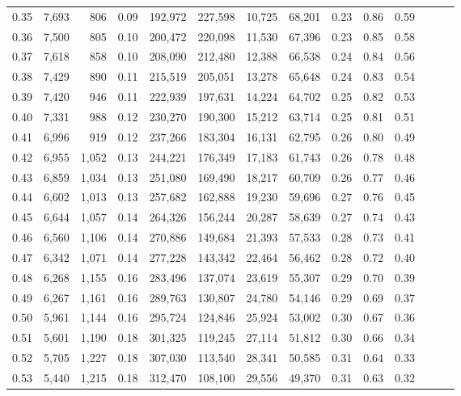 \begin{tabular}{rrrrrrrrrrrrrr}
0.35 &  7,693 &    806 &  0.09 &  192,972 &  227,598 &  10,725 &  68,201 &  0.23 &  0.86 &      0.59 \\
0.36 &  7,500 &    805 &  0.10 &  200,472 &  220,098 &  11,530 &  67,396 &  0.23 &  0.85 &      0.58 \\
0.37 &  7,618 &    858 &  0.10 &  208,090 &  212,480 &  12,388 &  66,538 &  0.24 &  0.84 &      0.56 \\
0.38 &  7,429 &    890 &  0.11 &  215,519 &  205,051 &  13,278 &  65,648 &  0.24 &  0.83 &      0.54 \\
0.39 &  7,420 &    946 &  0.11 &  222,939 &  197,631 &  14,224 &  64,702 &  0.25 &  0.82 &      0.53 \\
0.40 &  7,331 &    988 &  0.12 &  230,270 &  190,300 &  15,212 &  63,714 &  0.25 &  0.81 &      0.51 \\
0.41 &  6,996 &    919 &  0.12 &  237,266 &  183,304 &  16,131 &  62,795 &  0.26 &  0.80 &      0.49 \\
0.42 &  6,955 &  1,052 &  0.13 &  244,221 &  176,349 &  17,183 &  61,743 &  0.26 &  0.78 &      0.48 \\
0.43 &  6,859 &  1,034 &  0.13 &  251,080 &  169,490 &  18,217 &  60,709 &  0.26 &  0.77 &      0.46 \\
0.44 &  6,602 &  1,013 &  0.13 &  257,682 &  162,888 &  19,230 &  59,696 &  0.27 &  0.76 &      0.45 \\
0.45 &  6,644 &  1,057 &  0.14 &  264,326 &  156,244 &  20,287 &  58,639 &  0.27 &  0.74 &      0.43 \\
0.46 &  6,560 &  1,106 &  0.14 &  270,886 &  149,684 &  21,393 &  57,533 &  0.28 &  0.73 &      0.41 \\
0.47 &  6,342 &  1,071 &  0.14 &  277,228 &  143,342 &  22,464 &  56,462 &  0.28 &  0.72 &      0.40 \\
0.48 &  6,268 &  1,155 &  0.16 &  283,496 &  137,074 &  23,619 &  55,307 &  0.29 &  0.70 &      0.39 \\
0.49 &  6,267 &  1,161 &  0.16 &  289,763 &  130,807 &  24,780 &  54,146 &  0.29 &  0.69 &      0.37 \\
0.50 &  5,961 &  1,144 &  0.16 &  295,724 &  124,846 &  25,924 &  53,002 &  0.30 &  0.67 &      0.36 \\
0.51 &  5,601 &  1,190 &  0.18 &  301,325 &  119,245 &  27,114 &  51,812 &  0.30 &  0.66 &      0.34 \\
0.52 &  5,705 &  1,227 &  0.18 &  307,030 &  113,540 &  28,341 &  50,585 &  0.31 &  0.64 &      0.33 \\
0.53 &  5,440 &  1,215 &  0.18 &  312,470 &  108,100 &  29,556 &  49,370 &  0.31 &  0.63 &      0.32 \\

\end{tabular}
